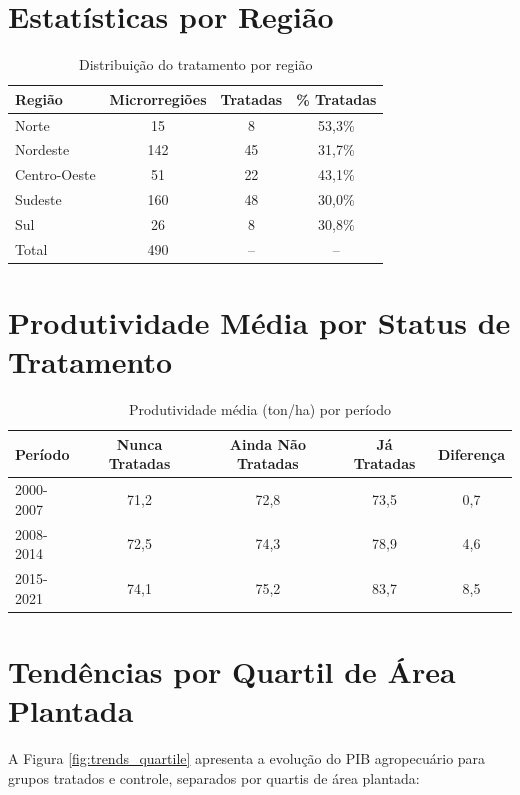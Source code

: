 \documentclass[
	12pt,				%
	oneside,			%
	a4paper,			%
	english,			%
	french,				%
	spanish,			%
	brazil				%
	]{abntex2}
\begin{document}
\begin{apendicesenv}
\section{Estatísticas por Região}

\begin{table}[h]
\centering
\caption{Distribuição do tratamento por região}
\label{tab:tratamento_regional}
\begin{tabular}{lccc}
\toprule
Região & Microrregiões & Tratadas & \% Tratadas \\
\midrule
Norte & 15 & 8 & 53,3\% \\
Nordeste & 142 & 45 & 31,7\% \\
Centro-Oeste & 51 & 22 & 43,1\% \\
Sudeste & 160 & 48 & 30,0\% \\
Sul & 26 & 8 & 30,8\% \\
\midrule
Total & 490 & -- & -- \\
\bottomrule
\end{tabular}
\end{table}

\section{Produtividade Média por Status de Tratamento}

\begin{table}[h]
\centering
\caption{Produtividade média (ton/ha) por período}
\label{tab:produtividade_status}
\begin{tabular}{lcccc}
\toprule
Período & Nunca Tratadas & Ainda Não Tratadas & Já Tratadas & Diferença \\
\midrule
2000-2007 & 71,2 & 72,8 & 73,5 & 0,7 \\
2008-2014 & 72,5 & 74,3 & 78,9 & 4,6 \\
2015-2021 & 74,1 & 75,2 & 83,7 & 8,5 \\
\bottomrule
\end{tabular}
\end{table}

\section{Tendências por Quartil de Área Plantada}

A Figura \ref{fig:trends_quartile} apresenta a evolução do PIB agropecuário para grupos tratados e controle, separados por quartis de área plantada:


\end{apendicesenv}
\end{document}
